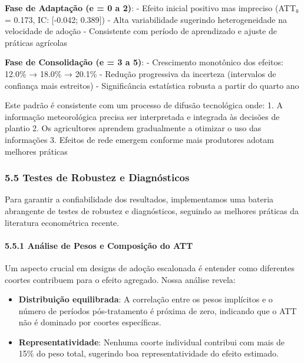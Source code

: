 \documentclass[
  brazilian,
  12pt,
  a4paper,
]{article}
\providecommand{\tightlist}{%
  \setlength{\itemsep}{0pt}\setlength{\parskip}{0pt}}
\begin{document}
\textbf{Fase de Adaptação (e = 0 a 2)}: - Efeito inicial positivo mas
impreciso (ATT₀ = 0.173, IC: {[}-0.042; 0.389{]}) - Alta variabilidade
sugerindo heterogeneidade na velocidade de adoção - Consistente com
período de aprendizado e ajuste de práticas agrícolas

\textbf{Fase de Consolidação (e = 3 a 5)}: - Crescimento monotônico dos
efeitos: 12.0\% → 18.0\% → 20.1\% - Redução progressiva da incerteza
(intervalos de confiança mais estreitos) - Significância estatística
robusta a partir do quarto ano

Este padrão é consistente com um processo de difusão tecnológica onde:
1. A informação meteorológica precisa ser interpretada e integrada às
decisões de plantio 2. Os agricultores aprendem gradualmente a otimizar
o uso das informações 3. Efeitos de rede emergem conforme mais
produtores adotam melhores práticas

\subsubsection{\texorpdfstring{\textbf{5.5 Testes de Robustez e
Diagnósticos}}{5.5 Testes de Robustez e Diagnósticos}}\label{testes-de-robustez-e-diagnuxf3sticos}

Para garantir a confiabilidade dos resultados, implementamos uma bateria
abrangente de testes de robustez e diagnósticos, seguindo as melhores
práticas da literatura econométrica recente.

\paragraph{\texorpdfstring{\textbf{5.5.1 Análise de Pesos e Composição
do
ATT}}{5.5.1 Análise de Pesos e Composição do ATT}}\label{anuxe1lise-de-pesos-e-composiuxe7uxe3o-do-att}

Um aspecto crucial em designs de adoção escalonada é entender como
diferentes coortes contribuem para o efeito agregado. Nossa análise
revela:

\begin{itemize}
\tightlist
\item
  \textbf{Distribuição equilibrada}: A correlação entre os pesos
  implícitos e o número de períodos pós-tratamento é próxima de zero,
  indicando que o ATT não é dominado por coortes específicas.
\item
  \textbf{Representatividade}: Nenhuma coorte individual contribui com
  mais de 15\% do peso total, sugerindo boa representatividade do efeito
  estimado.
\end{itemize}
\end{document}

